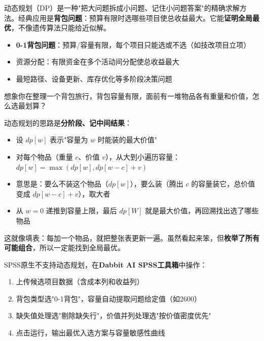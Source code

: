 
\begin{algointro}
动态规划（DP）是一种"把大问题拆成小问题、记住小问题答案"的精确求解方法。经典应用是\textbf{背包问题}：预算有限时选哪些项目使总收益最大。它能\textbf{证明全局最优}，不像遗传算法只能给近似解。
\end{algointro}

\begin{algoscene}
\begin{itemize}
    \item \textbf{0-1背包问题}：预算/容量有限，每个项目只能选或不选（如技改项目立项）
    \item 资源分配：有限资金在多个活动间分配使总收益最大
    \item 最短路径、设备更新、库存优化等多阶段决策问题
\end{itemize}
\end{algoscene}

\begin{algoprinciple}
想象你在整理一个背包旅行，背包容量有限，面前有一堆物品各有重量和价值，怎么选最划算？

动态规划的思路是\textbf{分阶段、记中间结果}：

\begin{itemize}
    \item 设 $dp[w]$ 表示"容量为 $w$ 时能装的最大价值"
    \item 对每个物品（重量 $c$、价值 $v$），从大到小遍历容量：$dp[w] = \max(dp[w], dp[w-c] + v)$
    \item 意思是：要么不装这个物品（$dp[w]$），要么装（腾出 $c$ 的容量装它，总价值变成 $dp[w-c]+v$），取大者
    \item 从 $w=0$ 递推到容量上限，最后 $dp[W]$ 就是最大价值，再回溯找出选了哪些物品
\end{itemize}

这就像填表：每加一个物品，就把整张表更新一遍。虽然看起来笨，但\textbf{枚举了所有可能组合}，所以一定能找到全局最优。
\end{algoprinciple}

\begin{algosposs}
SPSS原生不支持动态规划，在\textbf{Dabbit AI SPSS工具箱}中操作：

\begin{enumerate}
    \item 上传候选项目数据（含成本列和收益列）
    \item 背包类型选"0-1背包"，容量自动提取问题给定值（如2600）
    \item 缺失值处理选"剔除缺失行"，价值并列处理选"按价值密度优先"
    \item 点击运行，输出最优入选方案与容量敏感性曲线
\end{enumerate}
\end{algosposs}

